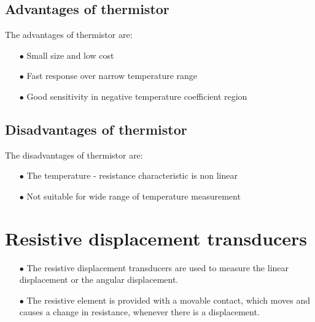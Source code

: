 \subsection{Advantages of thermistor}\label{sec8.9.3}

The advantages of thermistor are:
\begin{itemize}
\item[$\bullet$] Small size and low cost

\item[$\bullet$] Fast response over narrow temperature range

\item[$\bullet$] Good sensitivity in negative temperature coefficient region
\end{itemize}

\subsection{Disadvantages of thermistor}\label{sec8.9.4}

The disadvantages of thermistor are:
\begin{itemize}
\item[$\bullet$] The temperature - resistance characteristic is non linear

\item[$\bullet$] Not suitable for wide range of temperature measurement
\end{itemize}

\section{Resistive displacement transducers}\label{sec8.10}

\begin{itemize}
\item[$\bullet$] The resistive displacement transducers are used to measure the linear displacement or the angular displacement.

\item[$\bullet$] The resistive element is provided with a movable contact, which moves and causes a change in resistance, whenever there is a displacement.
\end{itemize}

